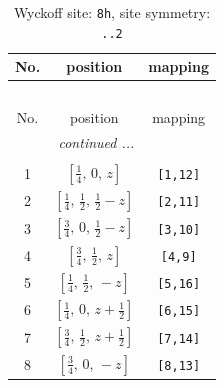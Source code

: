 \documentclass[fleqn,8pt]{jsarticle}
\begin{document}
\begin{longtable}{ccc}
\caption{Wyckoff site: {\tt 8h}, site symmetry: {\tt ..2}}
 \\
 \hline \hline
No. & position & mapping \\ \hline \endfirsthead

\multicolumn{2}{l}{\tablename\ \thetable{}} \\
 \hline \hline
No. & position & mapping \\ \hline \endhead

 \hline \hline
\multicolumn{2}{r}{\footnotesize\it continued ...} \\ \endfoot

 \hline \hline
\multicolumn{2}{r}{} \\ \endlastfoot

1 & $\left[ \frac{1}{4},\, 0,\, z \right]$ & {\tt [1,12]} \\ \hline
2 & $\left[ \frac{1}{4},\, \frac{1}{2},\, \frac{1}{2} - z \right]$ & {\tt [2,11]} \\ \hline
3 & $\left[ \frac{3}{4},\, 0,\, \frac{1}{2} - z \right]$ & {\tt [3,10]} \\ \hline
4 & $\left[ \frac{3}{4},\, \frac{1}{2},\, z \right]$ & {\tt [4,9]} \\ \hline
5 & $\left[ \frac{1}{4},\, \frac{1}{2},\, - z \right]$ & {\tt [5,16]} \\ \hline
6 & $\left[ \frac{1}{4},\, 0,\, z + \frac{1}{2} \right]$ & {\tt [6,15]} \\ \hline
7 & $\left[ \frac{3}{4},\, \frac{1}{2},\, z + \frac{1}{2} \right]$ & {\tt [7,14]} \\ \hline
8 & $\left[ \frac{3}{4},\, 0,\, - z \right]$ & {\tt [8,13]} \\
\end{longtable}
\renewcommand{\arraystretch}{1.2}
\end{document}
